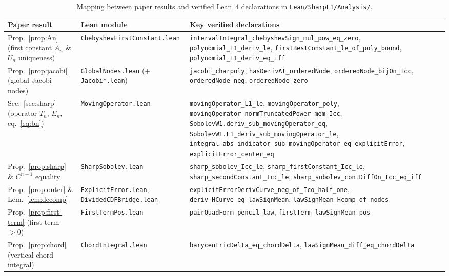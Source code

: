 \documentclass[11pt,a4paper]{article}
\renewcommand{\UrlFont}{\ttfamily\small}
\newcommand{\code}[1]{\nolinkurl{#1}}
\theoremstyle{remark}
\numberwithin{equation}{section}
\begin{document}
\begin{table}[htbp]
\centering
\caption{Mapping between paper results and verified Lean~4 declarations in \code{Lean/SharpL1/Analysis/}.}
\label{tab:lean-map}
\footnotesize
\renewcommand{\UrlFont}{\ttfamily\footnotesize}
\renewcommand{\arraystretch}{1.2}
\begin{tabular}{@{}p{3.4cm}>{\raggedright\arraybackslash}p{3.7cm}>{\raggedright\arraybackslash}p{8.0cm}@{}}
\toprule
\textbf{Paper result} & \textbf{Lean module} & \textbf{Key verified declarations} \\
\midrule
Prop.~\ref{prop:An} (first constant $A_n$ \& $U_n$ uniqueness) &
\code{ChebyshevFirstConstant.lean} &
\code{intervalIntegral_chebyshevSign_mul_pow_eq_zero}, \code{polynomial_L1_deriv_le}, \code{firstBestConstant_le_of_poly_bound}, \code{polynomial_L1_deriv_eq_iff} \\
\addlinespace[3pt]
Prop.~\ref{prop:jacobi} (global Jacobi nodes) &
\code{GlobalNodes.lean} (+ \code{Jacobi*.lean}) &
\code{jacobi_charpoly}, \code{hasDerivAt_orderedNode}, \code{orderedNode_bijOn_Icc}, \code{orderedNode_neg}, \code{orderedNode_zero} \\
\addlinespace[3pt]
Sec.~\ref{sec:sharp} (operator $T_n$, $E_n$, eq.~\eqref{eq:bn}) &
\code{MovingOperator.lean} &
\code{movingOperator_L1_le}, \code{movingOperator_poly}, \code{movingOperator_normTruncatedPower_mem_Icc}, \code{SobolevW1.deriv_sub_movingOperator_eq}, \code{SobolevW1.L1_deriv_sub_movingOperator_le}, \code{integral_abs_indicator_sub_movingOperator_eq_explicitError}, \code{explicitError_center_eq} \\
\addlinespace[3pt]
Prop.~\ref{prop:sharp} \& $C^{n+1}$ equality &
\code{SharpSobolev.lean} &
\code{sharp_sobolev_Icc_le}, \code{sharp_firstConstant_Icc_le}, \code{sharp_secondConstant_Icc_le}, \code{sharp_sobolev_contDiffOn_Icc_eq_iff} \\
\addlinespace[3pt]
Prop.~\ref{prop:outer} \& Lem.~\ref{lem:decomp} &
\code{ExplicitError.lean}, \code{DividedCDFBridge.lean} &
\code{explicitErrorDerivCurve_neg_of_Ico_half_one}, \code{deriv_HCurve_eq_lawSignMean}, \code{lawSignMean_Hcomp_of_nodes} \\
\addlinespace[3pt]
Prop.~\ref{prop:first-term} (first term $> 0$) &
\code{FirstTermPos.lean} &
\code{pairQuadForm_pencil_law}, \code{firstTerm_lawSignMean_pos} \\
\addlinespace[3pt]
Prop.~\ref{prop:chord} (vertical-chord integral) &
\code{ChordIntegral.lean} &
\code{barycentricDelta_eq_chordDelta}, \code{lawSignMean_diff_eq_chordDelta} \\

\end{tabular}
\end{table}
\end{document}
